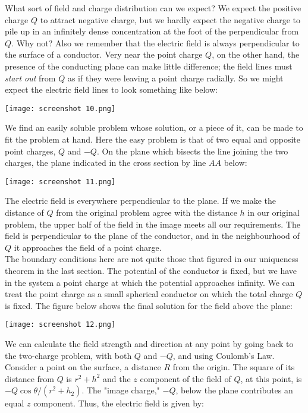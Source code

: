 \documentclass[svgnames]{article}
\begin{document}
What sort of field and charge distribution can we expect? We expect the
positive charge $Q$ to attract negative charge, but we hardly expect the
negative charge to pile up in an infinitely dense concentration at the foot of
the perpendicular from $Q$. Why not? Also we remember that the electric field
is always perpendicular to the surface of a conductor. Very near the point
charge $Q$, on the other hand, the presence of the conducting plane can make
little difference; the field lines must \textit{start out} from $Q$ as if they
were leaving a point charge radially. So we might expect the electric field
lines to look something like below: 

\begin{center}
\texttt{[image: screenshot 10.png]}
\end{center}

We find an easily soluble problem whose solution, or a piece of it, can be made
to fit the problem at hand. Here the easy problem is that of two equal and
opposite point charges, $Q$ and $-Q$. On the plane which bisects the line
joining the two charges, the plane indicated in the cross section by line $AA$
below: 

\begin{center}
\texttt{[image: screenshot 11.png]}
\end{center}

The electric field is everywhere perpendicular to the plane. If we make the
distance of $Q$ from the original problem agree with the distance $h$ in our
original problem, the upper half of the field in the image meets all our
requirements. The field is perpendicular to the plane of the conductor, and in
the neighbourhood of $Q$ it approaches the field of a point charge. \\

The boundary conditions here are not quite those that figured in our uniqueness
theorem in the last section. The potential of the conductor is fixed, but we
have in the system a point charge at which the potential approaches infinity.
We can treat the point charge as a small spherical conductor on which the total
charge $Q$ is fixed. The figure below shows the final solution for the field
above the plane: 

\begin{center}
\texttt{[image: screenshot 12.png]}
\end{center}

We can calculate the field strength and direction at any point by going back to
the two-charge problem, with both $Q$ and $-Q$, and using Coulomb's Law. \\
Consider a point on the surface, a distance $R$ from the origin. The square of
its distance from $Q$ is $r^2 + h^2$ and the $z$ component of the field of $Q$,
at this point, is $-Q\cos\theta / (r^2 + h_2)$. The "image charge," $-Q$, below
the plane contributes an equal $z$ component. Thus, the electric field is given
by: 
\end{document}
